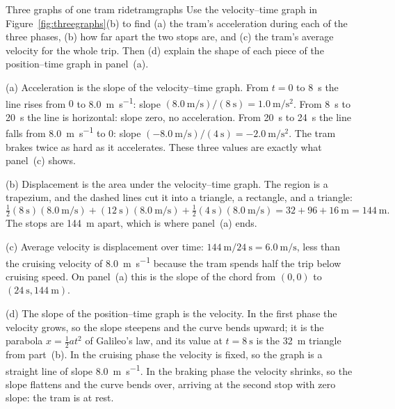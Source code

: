 \begin{example}{Three graphs of one tram ride}{tramgraphs}
Use the velocity--time graph in Figure~\ref{fig:threegraphs}(b) to find (a) the tram's acceleration during each of the three phases, (b) how far apart the two stops are, and (c) the tram's average velocity for the whole trip. Then (d) explain the shape of each piece of the position--time graph in panel~(a).

\elem (a) Acceleration is the slope of the velocity--time graph. From $t = 0$ to \SI{8}{\second} the line rises from $0$ to \SI{8.0}{\metre\per\second}: slope $(\SI{8.0}{\metre\per\second})/(\SI{8}{\second}) = \SI{1.0}{\metre\per\second\squared}$. From \SI{8}{\second} to \SI{20}{\second} the line is horizontal: slope zero, no acceleration. From \SI{20}{\second} to \SI{24}{\second} the line falls from \SI{8.0}{\metre\per\second} to $0$: slope $(\SI{-8.0}{\metre\per\second})/(\SI{4}{\second}) = \SI{-2.0}{\metre\per\second\squared}$. The tram brakes twice as hard as it accelerates. These three values are exactly what panel~(c) shows.

(b) Displacement is the area under the velocity--time graph. The region is a trapezium, and the dashed lines cut it into a triangle, a rectangle, and a triangle:
\[
\tfrac12(\SI{8}{\second})(\SI{8.0}{\metre\per\second}) + (\SI{12}{\second})(\SI{8.0}{\metre\per\second}) + \tfrac12(\SI{4}{\second})(\SI{8.0}{\metre\per\second}) = 32 + 96 + 16\ \si{\metre} = \SI{144}{\metre}.
\]
The stops are \SI{144}{\metre} apart, which is where panel~(a) ends.

(c) Average velocity is displacement over time: $\SI{144}{\metre}/\SI{24}{\second} = \SI{6.0}{\metre\per\second}$, less than the cruising velocity of \SI{8.0}{\metre\per\second} because the tram spends half the trip below cruising speed. On panel~(a) this is the slope of the chord from $(0, 0)$ to $(\SI{24}{\second}, \SI{144}{\metre})$.

(d) The slope of the position--time graph is the velocity. In the first phase the velocity grows, so the slope steepens and the curve bends upward; it is the parabola $x = \tfrac12 a t^2$ of Galileo's law, and its value at $t = \SI{8}{\second}$ is the \SI{32}{\metre} triangle from part~(b). In the cruising phase the velocity is fixed, so the graph is a straight line of slope \SI{8.0}{\metre\per\second}. In the braking phase the velocity shrinks, so the slope flattens and the curve bends over, arriving at the second stop with zero slope: the tram is at rest.


\end{example}
